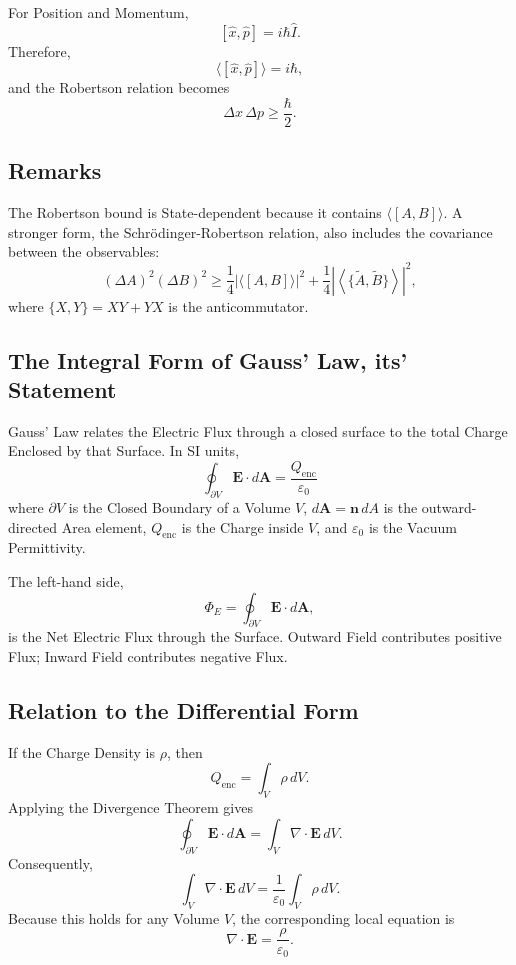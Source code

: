 \documentclass[a4paper, 10pt, onepage]{elegantbook}
\begin{document}
{For Position and Momentum,
\[
[\hat{x},\hat{p}]=i\hbar\hat{I}.
\]
Therefore,
\[
\langle[\hat{x},\hat{p}]\rangle=i\hbar,
\]
and the Robertson relation becomes
\[
\boxed{\Delta x\,\Delta p\geq\frac{\hbar}{2}}.
\]

\subsection{Remarks}

The Robertson bound is State-dependent because it contains
\(\langle[A,B]\rangle\). A stronger form, the
Schr\"odinger-Robertson relation, also includes the covariance between the observables:
\[
(\Delta A)^2(\Delta B)^2
\geq
\frac{1}{4}\left|\langle[A,B]\rangle\right|^2
+
\frac{1}{4}\left|\left\langle
\{\widetilde{A},\widetilde{B}\}
\right\rangle\right|^2,
\]
where \(\{X,Y\}=XY+YX\) is the anticommutator.

\subsection{The Integral Form of Gauss' Law, its' Statement}

Gauss' Law relates the Electric Flux through a closed surface to the
total Charge Enclosed by that Surface. In SI units,
\[
\boxed{
\oint_{\partial V}\mathbf{E}\cdot d\mathbf{A}
=\frac{Q_{\mathrm{enc}}}{\varepsilon_0}
}
\]
where \(\partial V\) is the Closed Boundary of a Volume \(V\),
\(d\mathbf{A}= \mathbf{n}\,dA\) is the outward-directed Area element,
\(Q_{\mathrm{enc}}\) is the Charge inside \(V\), and
\(\varepsilon_0\) is the Vacuum Permittivity.

The left-hand side,
\[
\Phi_E=\oint_{\partial V}\mathbf{E}\cdot d\mathbf{A},
\]
is the Net Electric Flux through the Surface. Outward Field contributes positive Flux; Inward Field contributes 
negative Flux.

\subsection{Relation to the Differential Form}

If the Charge Density is \(\rho\), then
\[
Q_{\mathrm{enc}}=\int_V \rho\,dV.
\]
Applying the Divergence Theorem gives
\[
\oint_{\partial V}\mathbf{E}\cdot d\mathbf{A}
=\int_V\nabla\cdot\mathbf{E}\,dV.
\]
Consequently,
\[
\int_V\nabla\cdot\mathbf{E}\,dV
=\frac{1}{\varepsilon_0}\int_V\rho\,dV.
\]
Because this holds for any Volume \(V\), the corresponding local equation is
\[
\nabla\cdot\mathbf{E}=\frac{\rho}{\varepsilon_0}.
\]

}
\end{document}
